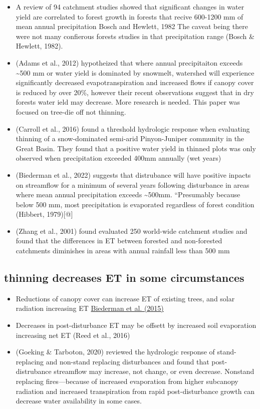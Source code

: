 \documentclass[
]{agujournal2019}
\begin{document}
\begin{itemize}
\item
  A review of 94 catchment studies showed that significant changes in
  water yield are correlated to forest growth in forests that recive
  600-1200 mm of mean annual precipitation Bosch and Hewlett, 1982 The
  caveat being there were not many confierous forests studies in that
  precipitation range (Bosch \& Hewlett, 1982).
\item
  (Adams et al., 2012) hypotheized that where annual precipitaiton
  exceeds \textasciitilde500 mm or water yield is dominated by snowmelt,
  watershed will experience significantly decreased evapotranspiration
  and increased flows if canopy cover is reduced by over 20\%, however
  their recent observations suggest that in dry forests water ield may
  decrease. More research is needed. This paper was focused on tree-die
  off not thinning.
\item
  (Carroll et al., 2016) found a threshold hydrologic response when
  evaluating thinning of a snow-dominated semi-arid Pinyon-Juniper
  community in the Great Basin. They found that a positive water yield
  in thinned plots was only observed when precipitation exceeded 400mm
  annually (wet years)
\item
  (Biederman et al., 2022) suggests that distrubance will have positive
  inpacts on streamflow for a minimum of several years following
  disturbance in areas where mean annual precipitation exceeds
  \textasciitilde500mm. ``Presumably because below 500 mm, most
  precipitation is evaporated regardless of forest condition (Hibbert,
  1979){[}@{]}
\item
  (Zhang et al., 2001) found evaluated 250 world-wide catchment studies
  and found that the differences in ET between forested and non-forested
  catchments diminishes in areas with annual rainfall less than 500 mm
\end{itemize}

\subsection{thinning decreases ET in some
circumstances}\label{thinning-decreases-et-in-some-circumstances}

\begin{itemize}
\item
  Reductions of canopy cover can increase ET of existing trees, and
  solar radiation increasing ET
  \href{Chen\%20et\%20al.,\%202005;\%20Bennett\%20et\%20al.,\%202018}{Biederman
  et al. (2015)}
\item
  Decreases in post-disturbance ET may be offsett by increased soil
  evaporation increasing net ET (Reed et al., 2016)
\item
  (Goeking \& Tarboton, 2020) reviewed the hydrologic response of
  stand-replacing and non-stand replacing disturbances and found that
  post-distrubance streamflow may increase, not change, or even
  decrease. Nonstand replacing fires---because of increased evaporation
  from higher subcanopy radiation and increased transpiration from rapid
  post-disturbance growth can decrease water availability in some cases.
\end{itemize}
\end{document}
